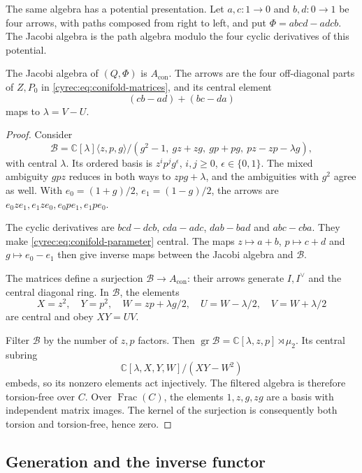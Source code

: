 The same algebra has a potential presentation. Let $a,c:1\to0$
and $b,d:0\to1$ be four arrows, with paths composed from right
to left, and put $\Phi=abcd-adcb$.
The Jacobi algebra is the path algebra modulo the four cyclic
derivatives of this potential.

\begin{proposition}\label{cyrec:prop:conifold-jacobi}
The Jacobi algebra of $(Q,\Phi)$ is $A_{\mathrm{con}}$.
The arrows are the four off-diagonal parts of $Z,P_0$ in
\eqref{cyrec:eq:conifold-matrices}, and its central element
\begin{equation}\label{cyrec:eq:conifold-parameter}
 (cb-ad)+(bc-da)
\end{equation}
maps to $\lambda=V-U$.
\end{proposition}

\begin{proof}
Consider
\[
 \mathcal B=\mathbb C[\lambda]\langle z,p,g\rangle/
       (g^2-1,\ gz+zg,\ gp+pg,\ pz-zp-\lambda g),
\]
with central $\lambda$. Its ordered basis is
$z^ip^jg^\epsilon$, $i,j\geq0$, $\epsilon\in\{0,1\}$.
The mixed ambiguity $gpz$ reduces in both ways to
$zpg+\lambda$, and the ambiguities with $g^2$ agree as well.
With $e_0=(1+g)/2$, $e_1=(1-g)/2$, the arrows are
$e_0ze_1,e_1ze_0,e_0pe_1,e_1pe_0$.

The cyclic derivatives are
$bcd-dcb$, $cda-adc$, $dab-bad$ and $abc-cba$.
They make \eqref{cyrec:eq:conifold-parameter} central.
The maps $z\mapsto a+b$, $p\mapsto c+d$ and
$g\mapsto e_0-e_1$ then give inverse maps between the
Jacobi algebra and $\mathcal B$.

The matrices define a surjection $\mathcal B\to A_{\mathrm{con}}$:
their arrows generate $I,I^\vee$ and the central diagonal ring.
In $\mathcal B$, the elements
\[
 X=z^2,\quad Y=p^2,\quad W=zp+\lambda g/2,
 \quad U=W-\lambda/2,\quad V=W+\lambda/2
\]
are central and obey $XY=UV$.

Filter $\mathcal B$ by the number of $z,p$ factors. Then
$\operatorname{gr}\mathcal B=\mathbb C[\lambda,z,p]\rtimes\mu_2$.
Its central subring
\[
 \mathbb C[\lambda,X,Y,W]/(XY-W^2)
\]
embeds, so its nonzero elements act injectively. The filtered algebra is therefore
torsion-free over $C$.
Over $\operatorname{Frac}(C)$, the elements $1,z,g,zg$ are
a basis with independent matrix images. The kernel of the
surjection is consequently both torsion and torsion-free, hence zero.
\end{proof}

\subsection{Generation and the inverse functor}

